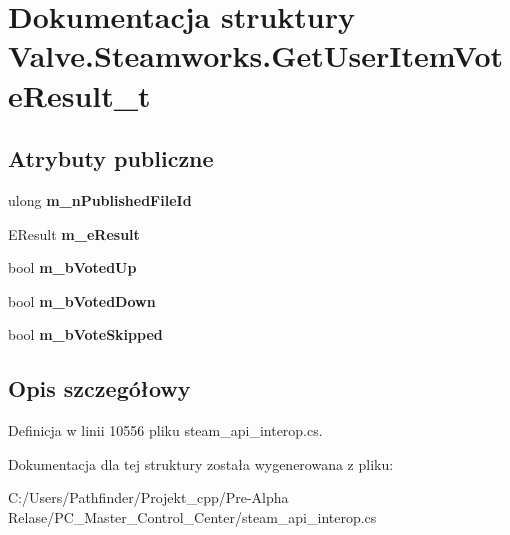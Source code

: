 \hypertarget{struct_valve_1_1_steamworks_1_1_get_user_item_vote_result__t}{}\section{Dokumentacja struktury Valve.\+Steamworks.\+Get\+User\+Item\+Vote\+Result\+\_\+t}
\label{struct_valve_1_1_steamworks_1_1_get_user_item_vote_result__t}
\subsection*{Atrybuty publiczne}
\begin{DoxyCompactItemize}
\item 
\mbox{\label{struct_valve_1_1_steamworks_1_1_get_user_item_vote_result__t_a67f5b3c90d48df53862a535af85356e0}} 
ulong {\bfseries m\+\_\+n\+Published\+File\+Id}
\item 
\mbox{\label{struct_valve_1_1_steamworks_1_1_get_user_item_vote_result__t_a395a8448908303f6af20cad975d35543}} 
E\+Result {\bfseries m\+\_\+e\+Result}
\item 
\mbox{\label{struct_valve_1_1_steamworks_1_1_get_user_item_vote_result__t_a87a90b4e22f6177d3049aae1bc17f3dd}} 
bool {\bfseries m\+\_\+b\+Voted\+Up}
\item 
\mbox{\label{struct_valve_1_1_steamworks_1_1_get_user_item_vote_result__t_a4b52206425f1bcda8aff1f26b696f3e0}} 
bool {\bfseries m\+\_\+b\+Voted\+Down}
\item 
\mbox{\label{struct_valve_1_1_steamworks_1_1_get_user_item_vote_result__t_af77d99eaf47954b68511abd2454098f0}} 
bool {\bfseries m\+\_\+b\+Vote\+Skipped}
\end{DoxyCompactItemize}


\subsection{Opis szczegółowy}


Definicja w linii 10556 pliku steam\+\_\+api\+\_\+interop.\+cs.



Dokumentacja dla tej struktury została wygenerowana z pliku\+:\begin{DoxyCompactItemize}
\item 
C\+:/\+Users/\+Pathfinder/\+Projekt\+\_\+cpp/\+Pre-\/\+Alpha Relase/\+P\+C\+\_\+\+Master\+\_\+\+Control\+\_\+\+Center/steam\+\_\+api\+\_\+interop.\+cs\end{DoxyCompactItemize}

